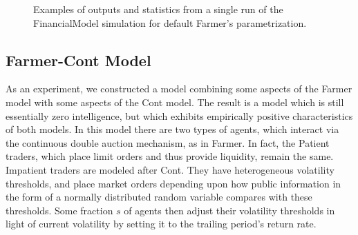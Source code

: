 \documentclass[runningheads]{llncs}
\begin{document}
\begin{figure}[htbp]
\begin{center}
{      }
    \caption{Examples of outputs and statistics from a single run of the FinancialModel simulation for default Farmer's parametrization.}
    \label{fig:sampleDynamicsFarmer}
  \end{center}
\end{figure}

\subsection{Farmer-Cont Model}

As an experiment, we constructed a model combining some aspects of the Farmer model with some aspects of the Cont model. The result is a model which is still essentially zero intelligence, but which exhibits empirically positive characteristics of both models. In this model there are two types of agents, which interact via the continuous double auction mechanism, as in Farmer. In fact, the Patient traders, which place limit orders and thus provide liquidity, remain the same. Impatient traders are modeled after Cont. They have heterogeneous volatility thresholds, and place market orders depending upon how public information in the form of a normally distributed random variable compares with these thresholds. Some fraction $s$ of agents then adjust their volatility thresholds in light of current volatility by setting it to the trailing period's return rate.
\end{document}
